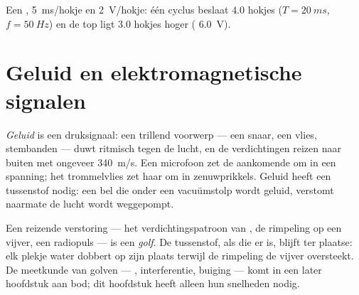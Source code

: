 \begin{omfigure}

{\small Een ,  \qty{5}{ms}/hokje en 
\qty{2}{V}/hokje: één cyclus beslaat $4.0$ hokjes ($T = \qty{20}{ms}$,
$f = \qty{50}{Hz}$) en de top ligt $3.0$ hokjes hoger (
\qty{6.0}{V}).}
\end{omfigure}

\section{Geluid en elektromagnetische signalen}

\begin{definition}[Geluid]\label{def:g10:signals-and-waves:sound}
\emph{Geluid} is een druksignaal: een trillend voorwerp ---
een snaar, een vlies, stembanden --- duwt ritmisch tegen de lucht, en de
verdichtingen reizen naar buiten met ongeveer \qty{340}{m/s}. Een
microfoon zet de aankomende  om in een spanning; het trommelvlies zet
haar om in zenuwprikkels. Geluid heeft een tussenstof nodig: een bel die
onder een vacuümstolp wordt geluid, verstomt naarmate de lucht wordt
weggepompt.
\end{definition}

\begin{definition}[Golf]\label{def:g10:signals-and-waves:wave}
Een reizende verstoring --- het verdichtingspatroon van , de
rimpeling op een vijver, een radiopuls --- is een \emph{golf}.
De tussenstof, als die er is, blijft ter plaatse: elk plekje water dobbert
op zijn plaats terwijl de rimpeling de vijver oversteekt. De meetkunde van
golven --- , interferentie, buiging --- komt in een later
hoofdstuk aan bod; dit hoofdstuk heeft alleen hun snelheden nodig.
\end{definition}

